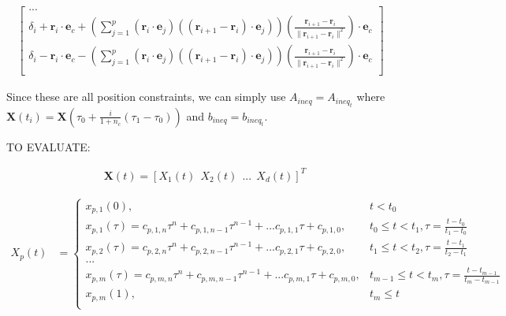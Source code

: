 \documentclass[11pt]{article}
\begin{document}
\begin{align*}
\begin{bmatrix}
... \\
\delta_i + \mathbf{r}_i \cdot \mathbf{e}_c +  \left( \sum_{j = 1}^{p}  {(\mathbf{r}_i \cdot \mathbf{e}_j)(( \mathbf{r}_{i+1} - \mathbf{r}_i ) \cdot \mathbf{e}_j)} \right) (\frac{ \mathbf{r}_{i+1} - \mathbf{r}_i } { \| \mathbf{r}_{i+1} - \mathbf{r}_i \|^2 }) \cdot \mathbf{e}_c \\
\delta_i - \mathbf{r}_i \cdot \mathbf{e}_c -  \left( \sum_{j = 1}^{p}  {(\mathbf{r}_i \cdot \mathbf{e}_j)(( \mathbf{r}_{i+1} - \mathbf{r}_i ) \cdot \mathbf{e}_j)} \right) (\frac{ \mathbf{r}_{i+1} - \mathbf{r}_i } { \| \mathbf{r}_{i+1} - \mathbf{r}_i \|^2 }) \cdot \mathbf{e}_c  \\
\end{bmatrix} &
\end{align*}

Since these are all position constraints, we can simply use $A_{ineq} = A_{ineq_t}$ where $\mathbf{X}(t_i) = \mathbf{X}(\tau_0 + \frac{i}{1+n_c} (\tau_1-\tau_0))$ and $b_{ineq} = b_{ineq_t}$. 



\mbox{} \newline
\mbox{} \newline
TO EVALUATE: \newline

\begin{align*}
\mathbf{X}(t) = [X_1(t) \ \ X_2(t) \ \ ... \ \ X_d(t)]^T
\end{align*}

\begin{align*}
X_p(t) &= 
\begin{cases}
    x_{p, 1} (0), & t < t_0 \\
    x_{p, 1} (\tau) = c_{p, 1, n} \tau^n + c_{p, 1, n-1} \tau^{n-1} + ... c_{p, 1, 1} \tau + c_{p, 1, 0}, & t_0 \le t < t_1, \tau = \frac{t-t_0}{t_1-t_0}  \\
    x_{p, 2} (\tau) = c_{p, 2, n} \tau^n + c_{p, 2, n-1} \tau^{n-1} + ... c_{p, 2, 1} \tau + c_{p, 2, 0}, & t_1 \le t < t_2, \tau = \frac{t-t_1}{t_2-t_1}  \\
    ... \\
    x_{p, m} (\tau) = c_{p, m, n} \tau^n + c_{p, m, n-1} \tau^{n-1} + ... c_{p, m, 1} \tau + c_{p, m, 0}, & t_{m-1} \le t < t_m, \tau = \frac{t-t_{m-1}}{t_m-t_{m-1}} \\
    x_{p, m} (1), & t_m \le t \\
\end{cases}
\end{align*} 
\end{document}
